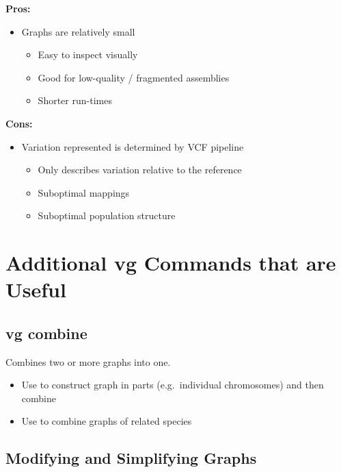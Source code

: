 \documentclass[
]{book}
\providecommand{\tightlist}{%
  \setlength{\itemsep}{0pt}\setlength{\parskip}{0pt}}
\begin{document}
\textbf{Pros:}

\begin{itemize}
\tightlist
\item
  Graphs are relatively small

  \begin{itemize}
  \tightlist
  \item
    Easy to inspect visually
  \item
    Good for low-quality / fragmented assemblies
  \item
    Shorter run-times
  \end{itemize}
\end{itemize}

\textbf{Cons:}

\begin{itemize}
\tightlist
\item
  Variation represented is determined by VCF pipeline

  \begin{itemize}
  \tightlist
  \item
    Only describes variation relative to the reference
  \item
    Suboptimal mappings
  \item
    Suboptimal population structure
  \end{itemize}
\end{itemize}

\hypertarget{additional-vg-commands-that-are-useful}{%
\section{Additional vg Commands that are Useful}\label{additional-vg-commands-that-are-useful}}

\hypertarget{vg-combine}{%
\subsection{vg combine}\label{vg-combine}}

Combines two or more graphs into one.

\begin{itemize}
\tightlist
\item
  Use to construct graph in parts (e.g.~individual chromosomes) and then combine
\item
  Use to combine graphs of related species
\end{itemize}

\hypertarget{modifying-and-simplifying-graphs}{%
\subsection{Modifying and Simplifying Graphs}\label{modifying-and-simplifying-graphs}}
\end{document}
